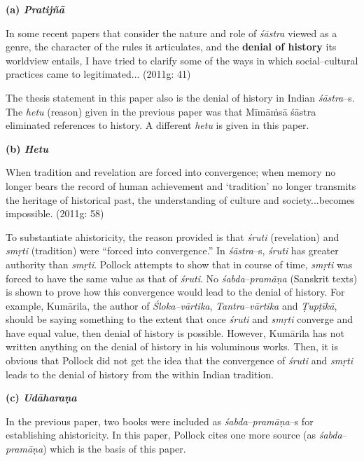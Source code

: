 \textbf{(a) \textit{Pratijñā}}

\begin{myquote}
In some recent papers that consider the nature and role of \textit{śāstra }viewed as a genre, the character of the rules it articulates, and the \textbf{denial of history} its worldview entails, I have tried to clarify some of the ways in which social–cultural practices came to legitimated... (2011g: 41)
\end{myquote}

The thesis statement in this paper also is the denial of history in Indian \textit{śāstra}–s. The \textit{hetu} (reason) given in the previous paper was that Mīmāṁsā śāstra eliminated references to history. A different \textit{hetu} is given in this paper.

\vspace{.15cm}

\textbf{(b) \textit{Hetu}}

\begin{myquote}
When tradition and revelation are forced into convergence; when memory no longer bears the record of human achievement and ‘tradition’ no longer transmits the heritage of historical past, the understanding of culture and society...becomes impossible. (2011g: 58)
\end{myquote}

To substantiate ahistoricity, the reason provided is that \textit{śruti }(revelation) and \textit{smṛti} (tradition) were “forced into convergence.” In \textit{śāstra}–s, \textit{śruti} has greater authority than \textit{smṛti}. Pollock attempts to show that in course of time, \textit{smṛti }was forced to have the same value as that of\textit{ śruti}. No \textit{śabda}–\textit{pramāṇa} (Sanskrit texts) is shown to prove how this convergence would lead to the denial of history. For example, Kumārila, the author of \textit{Śloka–vārtika}, \textit{Tantra–vārtika} and \textit{Ṭupṭīkā}, should be saying something to the extent that once \textit{śruti} and \textit{smṛti }converge and have equal value, then denial of history is possible. However, Kumārila has not written anything on the denial of history in his voluminous works. Then, it is obvious that Pollock did not get the idea that the convergence of \textit{śruti} and \textit{smṛti} leads to the denial of history from the within Indian tradition.

\newpage

\textbf{(c) \textit{Udāharaṇa}}

In the previous paper, two books were included as\textit{ śabda}–\textit{pramāṇa}–s for establishing ahistoricity. In this paper, Pollock cites one more source (as \textit{śabda}–\textit{pramāṇa}) which is the basis of this paper.

